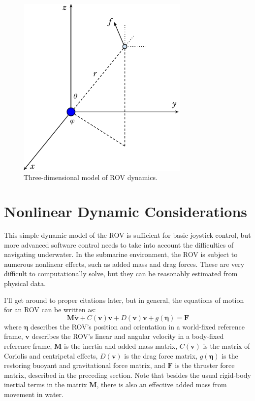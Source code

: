 \documentclass{article}
\renewcommand{\vec}[1]{\mathbf{#1}}
\begin{document}
\begin{figure}[ht]
  \centering
  \includegraphics[width=0.75\textwidth]{fig_3d.pdf}
  \caption{Three-dimensional model of ROV dynamics.}
  \label{3d}
\end{figure}

\section{Nonlinear Dynamic Considerations}
This simple dynamic model of the ROV is sufficient for basic joystick control, but more advanced software control needs to take into account the difficulties of navigating underwater. In the submarine environment, the ROV is subject to numerous nonlinear effects, such as added mass and drag forces. These are very difficult to computationally solve, but they can be reasonably estimated from physical data.

I'll get around to proper citations later, but in general, the equations of motion for an ROV can be written as:
\begin{equation}
  \vec{M}\dot{\vec{v}} + C(\vec{v})\vec{v} + D(\vec{v})\vec{v} + g(\vec{\eta}) = \vec{F}
\end{equation}
where $\vec{\eta}$ describes the ROV's position and orientation in a world-fixed reference frame, $\vec{v}$ describes the ROV's linear and angular velocity in a body-fixed reference frame, $\vec{M}$ is the inertia and added mass matrix, $C(\vec{v})$ is the matrix of Coriolis and centripetal effects, $D(\vec{v})$ is the drag force matrix, $g(\vec{\eta})$ is the restoring buoyant and gravitational force matrix, and $\vec{F}$ is the thruster force matrix, described in the preceding section. Note that besides the usual rigid-body inertial terms in the matrix $\vec{M}$, there is also an effective added mass from movement in water.
\end{document}
